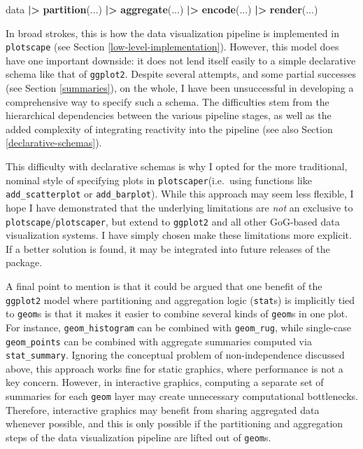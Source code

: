 \documentclass[
  openany]{book}
\newenvironment{Shaded}{\begin{snugshade}}{\end{snugshade}}
\newcommand{\FunctionTok}[1]{\textcolor[rgb]{0.13,0.29,0.53}{\textbf{#1}}}
\newcommand{\NormalTok}[1]{#1}
\newcommand{\SpecialCharTok}[1]{\textcolor[rgb]{0.81,0.36,0.00}{\textbf{#1}}}
\theoremstyle{definition}
\theoremstyle{definition}
\theoremstyle{definition}
\theoremstyle{definition}
\theoremstyle{remark}
\begin{document}
\begin{Shaded}
\begin{Highlighting}[]
\NormalTok{data }\SpecialCharTok{|\textgreater{}} 
  \FunctionTok{partition}\NormalTok{(...) }\SpecialCharTok{|\textgreater{}} 
  \FunctionTok{aggregate}\NormalTok{(...) }\SpecialCharTok{|\textgreater{}} 
  \FunctionTok{encode}\NormalTok{(...) }\SpecialCharTok{|\textgreater{}} 
  \FunctionTok{render}\NormalTok{(...)}
\end{Highlighting}
\end{Shaded}

In broad strokes, this is how the data visualization pipeline is implemented in \texttt{plotscape} (see Section \ref{low-level-implementation}). However, this model does have one important downside: it does not lend itself easily to a simple declarative schema like that of \texttt{ggplot2}. Despite several attempts, and some partial successes (see Section \ref{summaries}), on the whole, I have been unsuccessful in developing a comprehensive way to specify such a schema. The difficulties stem from the hierarchical dependencies between the various pipeline stages, as well as the added complexity of integrating reactivity into the pipeline (see also Section \ref{declarative-schemas}).

This difficulty with declarative schemas is why I opted for the more traditional, nominal style of specifying plots in \texttt{plotscaper}(i.e.~using functions like \texttt{add\_scatterplot} or \texttt{add\_barplot}). While this approach may seem less flexible, I hope I have demonstrated that the underlying limitations are \emph{not} an exclusive to \texttt{plotscape}/\texttt{plotscaper}, but extend to \texttt{ggplot2} and all other GoG-based data visualization systems. I have simply chosen make these limitations more explicit. If a better solution is found, it may be integrated into future releases of the package.

A final point to mention is that it could be argued that one benefit of the \texttt{ggplot2} model where partitioning and aggregation logic (\texttt{stat}s) is implicitly tied to \texttt{geom}s is that it makes it easier to combine several kinds of \texttt{geom}s in one plot. For instance, \texttt{geom\_histogram} can be combined with \texttt{geom\_rug}, while single-case \texttt{geom\_points} can be combined with aggregate summaries computed via \texttt{stat\_summary}. Ignoring the conceptual problem of non-independence discussed above, this approach works fine for static graphics, where performance is not a key concern. However, in interactive graphics, computing a separate set of summaries for each \texttt{geom} layer may create unnecessary computational bottlenecks. Therefore, interactive graphics may benefit from sharing aggregated data whenever possible, and this is only possible if the partitioning and aggregation steps of the data visualization pipeline are lifted out of \texttt{geom}s.
\end{document}
